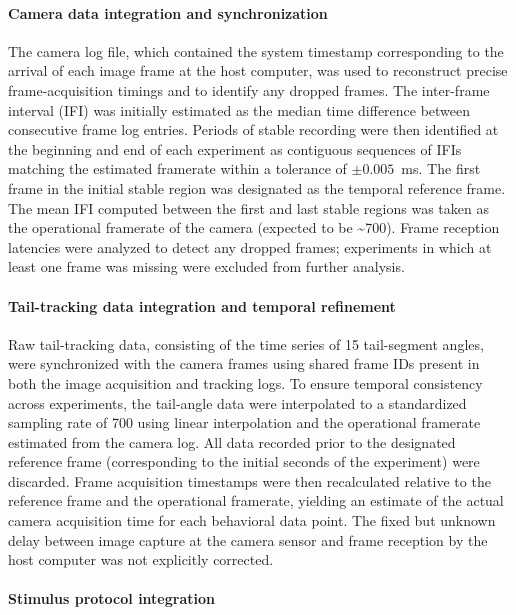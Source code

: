 \paragraph{Camera data integration and synchronization}

The camera log file, which contained the system timestamp corresponding to the arrival of each image frame at the host computer, was used to reconstruct precise frame-acquisition timings and to identify any dropped frames. The inter-frame interval (IFI) was initially estimated as the median time difference between consecutive frame log entries. Periods of stable recording were then identified at the beginning and end of each experiment as contiguous sequences of IFIs matching the estimated framerate within a tolerance of $\pm 0.005$~ms. The first frame in the initial stable region was designated as the temporal reference frame. The mean IFI computed between the first and last stable regions was taken as the operational framerate of the camera (expected to be \textasciitilde\SI{700}{\fps}). Frame reception latencies were analyzed to detect any dropped frames; experiments in which at least one frame was missing were excluded from further analysis.

\paragraph{Tail-tracking data integration and temporal refinement}

Raw tail-tracking data, consisting of the time series of 15 tail-segment angles, were synchronized with the camera frames using shared frame IDs present in both the image acquisition and tracking logs. To ensure temporal consistency across experiments, the tail-angle data were interpolated to a standardized sampling rate of \SI{700}{\fps} using linear interpolation and the operational framerate estimated from the camera log. All data recorded prior to the designated reference frame (corresponding to the initial seconds of the experiment) were discarded. Frame acquisition timestamps were then recalculated relative to the reference frame and the operational framerate, yielding an estimate of the actual camera acquisition time for each behavioral data point. The fixed but unknown delay between image capture at the camera sensor and frame reception by the host computer was not explicitly corrected.

\paragraph{Stimulus protocol integration}

